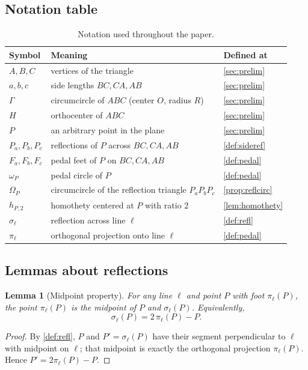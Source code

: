 \documentclass[11pt,a4paper]{article}
\newtheorem{lemma}[theorem]{Lemma}
\theoremstyle{definition}
\newcommand{\Pa}{P_{a}}
\newcommand{\Pb}{P_{b}}
\newcommand{\Pc}{P_{c}}
\newcommand{\Fa}{F_{a}}
\newcommand{\Fb}{F_{b}}
\newcommand{\Fc}{F_{c}}
\newcommand{\circc}{\Gamma}
\newcommand{\pedalc}{\omega_{P}}
\newcommand{\reflc}{\Omega_{P}}
\begin{document}
\subsection{Notation table}

\begin{table}[h]
\centering
\caption{Notation used throughout the paper.}
\label{tab:notation}
\begin{tabular}{lll}
\toprule
Symbol & Meaning & Defined at \\
\midrule
$A,B,C$ & vertices of the triangle & \cref{sec:prelim} \\
$a,b,c$ & side lengths $BC,CA,AB$ & \cref{sec:prelim} \\
$\circc$ & circumcircle of $ABC$ (center $O$, radius $R$) & \cref{sec:prelim} \\
$H$ & orthocenter of $ABC$ & \cref{sec:prelim} \\
$P$ & an arbitrary point in the plane & \cref{sec:prelim} \\
$\Pa,\Pb,\Pc$ & reflections of $P$ across $BC,CA,AB$ & \cref{def:sideref} \\
$\Fa,\Fb,\Fc$ & pedal feet of $P$ on $BC,CA,AB$ & \cref{def:pedal} \\
$\pedalc$ & pedal circle of $P$ & \cref{def:pedal} \\
$\reflc$ & circumcircle of the reflection triangle $\Pa\Pb\Pc$ & \cref{prop:reflcirc} \\
$h_{P,2}$ & homothety centered at $P$ with ratio $2$ & \cref{lem:homothety} \\
$\sigma_{\ell}$ & reflection across line $\ell$ & \cref{def:refl} \\
$\pi_{\ell}$ & orthogonal projection onto line $\ell$ & \cref{def:pedal} \\
\bottomrule
\end{tabular}
\end{table}

\subsection{Lemmas about reflections}

\begin{lemma}[Midpoint property]\label{lem:midpoint}
For any line $\ell$ and point $P$ with foot $\pi_{\ell}(P)$, the point $\pi_{\ell}(P)$ is the midpoint of $P$ and $\sigma_{\ell}(P)$. Equivalently,
\begin{equation}\label{eq:midpoint}
\sigma_{\ell}(P)=2\,\pi_{\ell}(P)-P.
\end{equation}
\end{lemma}
\begin{proof}
By \cref{def:refl}, $P$ and $P'=\sigma_{\ell}(P)$ have their segment perpendicular to $\ell$ with midpoint on $\ell$; that midpoint is exactly the orthogonal projection $\pi_{\ell}(P)$. Hence $P' = 2\pi_{\ell}(P)-P$.
\end{proof}
\end{document}
